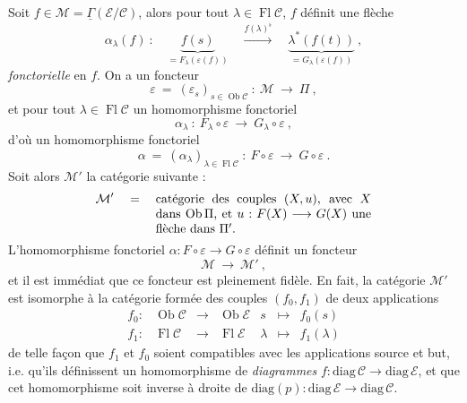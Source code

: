 \documentclass[11pt]{article}
\newcommand{\printedpage}[1]{\marginpar{\footnotesize p.~#1}}
\newcommand{\msp}[1]{\marginpar{\footnotesize [#1]}}
\newcommand{\Ob}{\operatorname{Ob}}
\newcommand{\Fl}{\operatorname{Fl}}
\newcommand{\uGamma}{\underline{\Gamma}}
\newcommand{\diag}{\mathrm{diag}\,}
\begin{document}
Soit $f \in \mathcal{M} = \uGamma(\mathcal{E}/\mathcal{C})$, alors pour tout $\lambda \in \Fl\mathcal{C}$, $f$ définit une flèche
\[
\alpha_\lambda(f) \ : \quad \underbrace{f(s)}_{= F_\lambda(\varepsilon(f))} \quad \xrightarrow{f(\lambda)^\flat} \quad \underbrace{\lambda^*(f(t))}_{= G_\lambda(\varepsilon(f))} \ ,
\]
\textit{fonctorielle} en $f$. On a un foncteur
\[
\varepsilon \ = \ (\varepsilon_s)_{s\in\Ob\mathcal{C}} \ : \ \mathcal{M} \ \longrightarrow \ \Pi \ ,
\]
et pour tout $\lambda \in \Fl\mathcal{C}$ un homomorphisme fonctoriel
\[
\alpha_\lambda \ : \ F_\lambda \circ \varepsilon \ \longrightarrow \ G_\lambda \circ \varepsilon \ ,
\]
d’où un homomorphisme fonctoriel
\[
\alpha \ = \ (\alpha_\lambda)_{\lambda\in\Fl\mathcal{C}} \ : \ F \circ \varepsilon \ \longrightarrow \ G \circ \varepsilon \ .
\]
Soit alors $\mathcal{M}'$ la catégorie suivante :
\printedpage{153}
\msp{page 403}
\[
\mathcal{M}' \quad = \quad \parbox[t]{0.5\textwidth}{catégorie des couples $(X,u)$, avec $X$ dans $\Ob\Pi$, et $u : F(X) \longrightarrow G(X)$ une flèche dans $\Pi'$.}
\]
L’homomorphisme fonctoriel $\alpha : F \circ \varepsilon \longrightarrow G \circ \varepsilon$ définit un foncteur
\[
\mathcal{M} \ \longrightarrow \ \mathcal{M}' \ ,
\]
et il est immédiat que ce foncteur est pleinement fidèle. En fait, la catégorie $\mathcal{M}'$ est isomorphe à la catégorie formée des couples $(f_0,f_1)$ de deux applications
\[
\begin{array}{lcccccc}
f_0 : & \Ob\mathcal{C} & \longrightarrow & \Ob\mathcal{E} & s & \longmapsto & f_0(s)\\[1ex]
f_1 : & \Fl\mathcal{C} & \longrightarrow & \Fl\mathcal{E} & \lambda & \longmapsto & f_1(\lambda)
\end{array}
\]
de telle façon que $f_1$ et $f_0$ soient compatibles avec les applications source et but, i.e. qu’ils définissent un homomorphisme de \textit{diagrammes} $f : \diag\mathcal{C} \longrightarrow \diag\mathcal{E}$, et que cet homomorphisme soit inverse à droite de $\mathrm{diag}(p) : \diag\mathcal{E} \longrightarrow \diag\mathcal{C}$.
\end{document}
